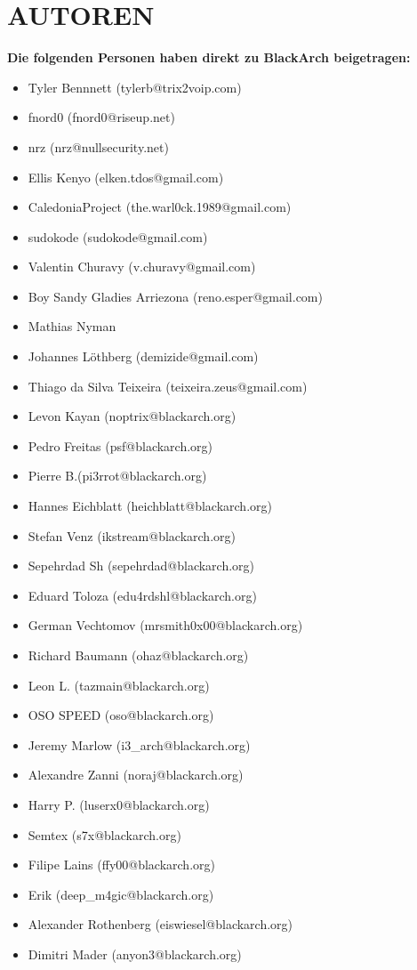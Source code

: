 \section{AUTOREN}
\textbf{Die folgenden Personen haben direkt zu BlackArch beigetragen:}
\begin{itemize}
\item Tyler Bennnett (tylerb@trix2voip.com)
\item fnord0 (fnord0@riseup.net)
\item nrz (nrz@nullsecurity.net)
\item Ellis Kenyo (elken.tdos@gmail.com)
\item CaledoniaProject (the.warl0ck.1989@gmail.com)
\item sudokode (sudokode@gmail.com)
\item Valentin Churavy (v.churavy@gmail.com)
\item Boy Sandy Gladies Arriezona (reno.esper@gmail.com)
\item Mathias Nyman
\item Johannes Löthberg (demizide@gmail.com)
\item Thiago da Silva Teixeira (teixeira.zeus@gmail.com)
\item Levon Kayan (noptrix@blackarch.org)
\item Pedro Freitas (psf@blackarch.org)
\item Pierre B.(pi3rrot@blackarch.org)
\item Hannes Eichblatt (heichblatt@blackarch.org)
\item Stefan Venz (ikstream@blackarch.org)
\item Sepehrdad Sh (sepehrdad@blackarch.org)
\item Eduard Toloza (edu4rdshl@blackarch.org)
\item German Vechtomov (mrsmith0x00@blackarch.org)
\item Richard Baumann (ohaz@blackarch.org)
\item Leon L. (tazmain@blackarch.org)
\item OSO SPEED (oso@blackarch.org)
\item Jeremy Marlow (i3\_arch@blackarch.org)
\item Alexandre Zanni (noraj@blackarch.org)
\item Harry P. (luserx0@blackarch.org)
\item Semtex (s7x@blackarch.org)
\item Filipe Lains (ffy00@blackarch.org)
\item Erik (deep\_m4gic@blackarch.org)
\item Alexander Rothenberg (eiswiesel@blackarch.org)
\item Dimitri Mader (anyon3@blackarch.org)
\end{itemize}

